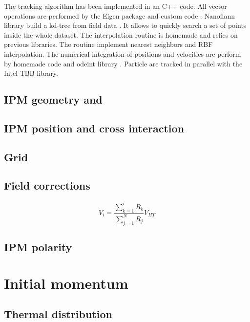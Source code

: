 \begin{refsection}
	

	The tracking algorithm has been implemented in an C++ code. All vector operations are performed by the Eigen package and custom code \cite{eigenweb}. Nanoflann library build a kd-tree from field data \cite{blanco2014nanoflann}. It allows to quickly search a set of points inside the whole dataset. The interpolation routine is homemade and relies on previous libraries. The routine implement nearest neighbors and RBF interpolation. The numerical integration of positions and velocities are perform by homemade code and odeint library \cite{Ahnert2011,Mulansky2014}. Particle are tracked in parallel with the Intel TBB library.

	\subsection{IPM geometry and}
	\subsection{IPM position and cross interaction}
	\subsection{Grid}
	\subsection{Field corrections}

	\begin{equation}
		V_{i} = \frac{\sum_{k = 1}^{i} R_{k}}{\sum_{j = 1}^{N} R_{j}}V_{HT}
	\end{equation}

	


	\subsection{IPM polarity}

	\section{Initial momentum}
	\subsection{Thermal distribution}
	

\end{refsection}
